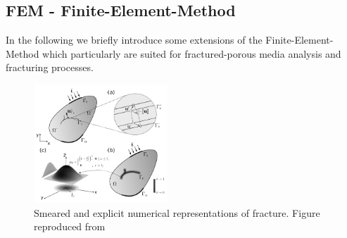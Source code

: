 \subsection*{FEM - Finite-Element-Method}
In the following we briefly introduce some extensions of the Finite-Element-Method which particularly are suited for fractured-porous media analysis and fracturing processes.




\clearpage
{}
\begin{figure}
\centering
\includegraphics[width=5cm]{figures/Schematic_figure_LIE_PF_NLD}
\caption{Smeared and explicit numerical representations of fracture. Figure reproduced from~\cite{Yoshioka2019}}
\label{fig:ogsfem-overview}
\end{figure}
